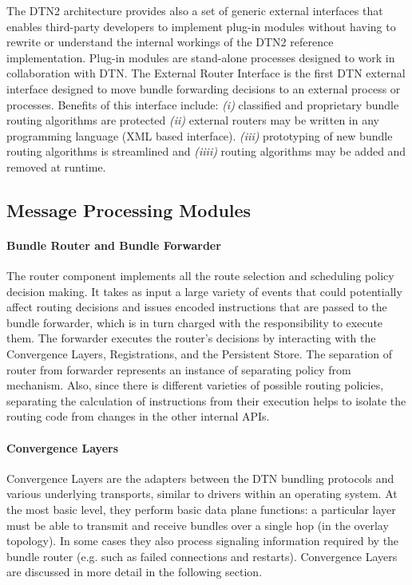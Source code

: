The DTN2 architecture provides also a set of generic external interfaces that enables third-party developers to implement plug-in modules without having to rewrite or understand the internal workings of the DTN2 reference implementation. Plug-in modules are stand-alone processes designed to work in collaboration with DTN.
The External Router Interface is the first DTN external interface designed to move bundle forwarding decisions to an external process or processes. Benefits of this interface include: \emph{(i)} classified and proprietary bundle routing algorithms are protected \emph{(ii)} external routers may be written in any programming language (XML based interface).
\emph{(iii)} prototyping of new bundle routing algorithms is streamlined and \emph{(iiii)} routing algorithms may be added and removed at runtime.

\subsection{Message Processing Modules}

\paragraph{Bundle Router and Bundle Forwarder} 
The router component implements all the route selection and scheduling policy decision making. It takes as input a large variety of events that could potentially affect
routing decisions and issues encoded instructions that are passed to the bundle forwarder, which is in turn charged with the responsibility to execute them. The forwarder executes the router's decisions by interacting with the Convergence Layers, Registrations, and the Persistent Store. The separation of router from forwarder represents an instance of separating policy from mechanism. Also, since there is different varieties of possible routing policies, separating the calculation of instructions from their execution helps to isolate the routing code from changes in the other internal APIs.

\paragraph{Convergence Layers}
Convergence Layers are the adapters between the DTN bundling protocols and various underlying transports,
similar to drivers within an operating system. At the most basic level, they perform basic data plane functions: a
particular layer must be able to transmit and receive bundles over a single hop (in the overlay topology). In some
cases they also process signaling information required by the bundle router (e.g. such as failed connections and
restarts). Convergence Layers are discussed in more detail in the following section.

